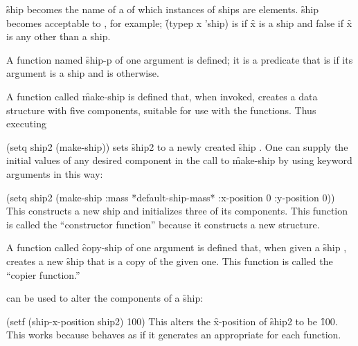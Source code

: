 \f{ship} becomes the name of a  of which instances
of ships are elements.  \f{ship} becomes acceptable to ,
for example; \f{(typep x 'ship)} is  if \f{x} is a ship
and false if \f{x} is any  other than a ship.

A function named \f{ship-p} of 
one argument is defined; it is a predicate
that is  if its argument is a ship and is  otherwise.

A function called \f{make-ship} is defined that, when invoked,
creates a data structure with five components, suitable for use with
the  functions.  Thus executing

\code
 (setq ship2 (make-ship))
\endcode
sets \f{ship2} to a newly created \f{ship} .
One can supply the initial values of any desired component in the call
to \f{make-ship} by using keyword arguments in this way:

\code
 (setq ship2 (make-ship :mass *default-ship-mass*
                        :x-position 0
                        :y-position 0))
\endcode
This constructs a new ship and initializes three of its components.
This function is called the ``constructor function''
because it constructs a new structure.

A function called \f{copy-ship} of one argument
is defined that, when given a \f{ship} ,
creates a new \f{ship}  that is a copy of the given one.
This function is called the ``copier function.''
\endlist

 can be used to alter the components of a \f{ship}:

\code
 (setf (ship-x-position ship2) 100)
\endcode
This alters the \f{x-position} of \f{ship2} to be \f{100}.
This works because  behaves as if
it generates an appropriate 
for each  function.



